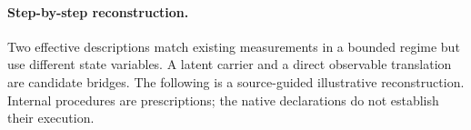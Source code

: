 %
%
%
\paragraph{Step-by-step reconstruction.}
Two effective descriptions match existing measurements in a bounded regime but use different state variables. A latent carrier and a direct observable translation are candidate bridges.
The following is a source-guided illustrative reconstruction. Internal procedures are prescriptions; the native declarations do not establish their execution.
